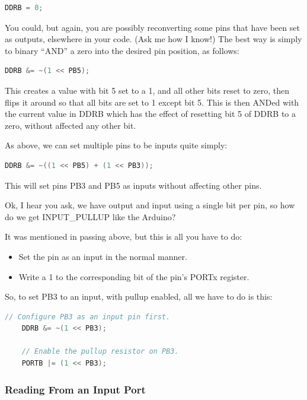 \begin{lstlisting}[language=C,numbers={none}]
	DDRB = 0;
\end{lstlisting}

You could, but again, you are possibly reconverting some pins that have been set as outputs, elsewhere in your code. (Ask me how I know!) The best way is simply to binary ``AND'' a zero into the desired pin position, as follows:

\begin{lstlisting}[language=C,numbers={none}]
	DDRB &= ~(1 << PB5);
\end{lstlisting}

This creates a value with bit 5 set to a 1, and all other bits reset to zero, then flips it around so that all bits are set to 1 except bit 5. This is then ANDed with the current value in DDRB which has the effect of resetting bit 5 of DDRB to a zero, without affected any other bit.

As above, we can set multiple pins to be inputs quite simply:

\begin{lstlisting}[language=C,numbers={none}]
	DDRB &= ~((1 << PB5) + (1 << PB3));
\end{lstlisting}

This will set pins PB3 and PB5 as inputs without affecting other pins.

Ok, I hear you ask, we have output and input using a single bit per pin, so how do we get INPUT\_PULLUP like the Arduino?

It was mentioned in passing above, but this is all you have to do:

\begin{itemize}
	\item Set the pin as an input in the normal manner.
	\item Write a 1 to the corresponding bit of the pin's PORTx register.
\end{itemize}

So, to set PB3 to an input, with pullup enabled, all we have to do is this:

\begin{lstlisting}[language=C,numbers={none}]
	// Configure PB3 as an input pin first.
	DDRB &= ~(1 << PB3);
	
	// Enable the pullup resistor on PB3.
	PORTB |= (1 << PB3);
\end{lstlisting}


\subsubsection{Reading From an Input Port}\label{avr-ports-input-reading}


